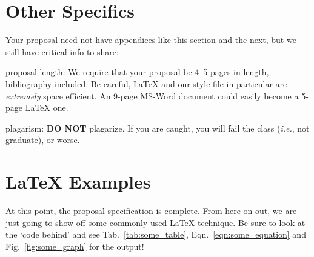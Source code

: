 \documentclass{sig-alternate}
\begin{document}

\vspace{150pt}

\appendix
\section{Other Specifics}
\label{app:other_specifics}
Your proposal need not have appendices like this section and the next, but we still have critical info to share:

\begin{enumerate*}
	\item {\sc proposal length}: We require that your proposal be 4--5 pages in length, bibliography included. Be careful, \LaTeX{} and our style-file in particular are \textit{extremely} space efficient. An 9-page MS-Word document could easily become a 5-page \LaTeX{} one.\vspace{5pt}
	\item {\sc plagarism}: \textbf{DO NOT} plagarize. If you are caught, you will fail the class (\textit{i.e.}, not graduate), or worse. 
\end{enumerate*}

\section{\LaTeX{} Examples}
\label{app:latex_examples}

At this point, the proposal specification is complete. From here on out, we are just going to show off some commonly used \LaTeX{} technique. Be sure to look at the `code behind' and see Tab.~\ref{tab:some_table}, Eqn.~\ref{eqn:some_equation} and Fig.~\ref{fig:some_graph} for the output!
\end{document}
